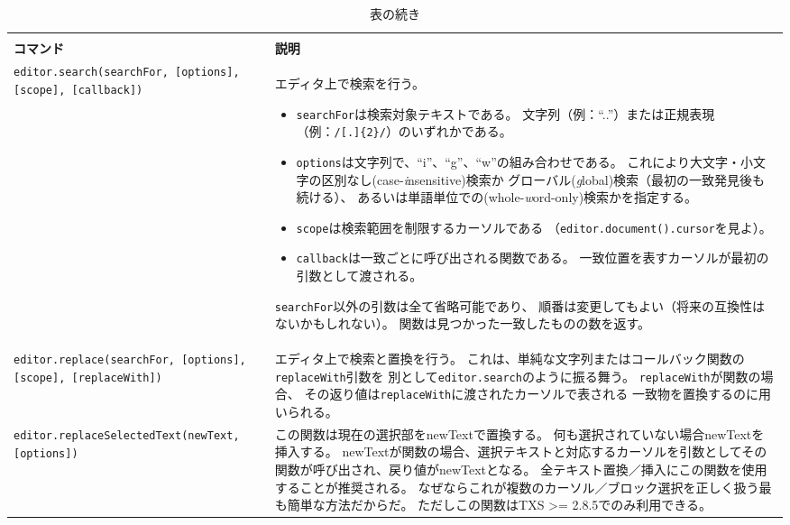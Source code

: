 \begin{longtable}{XX}
  \caption{エディタオブジェクトの一覧}
  \endfirsthead
  \caption{表の続き}
  \endhead
  \hline
  \multicolumn{2}{c}{\textbf{エディタオブジェクト}}\\
  \textbf{コマンド} & \textbf{説明}\\
  \hline
  \texttt{editor.search(searchFor, {[}options{]}, {[}scope{]}, {[}callback{]})}
    & エディタ上で検索を行う。
    \begin{itemize}
    \item
      \texttt{searchFor}は検索対象テキストである。
      文字列（例：``..''）または正規表現（例：\verb+/[.]{2}/+）のいずれかである。
    \item
      \texttt{options}は文字列で、``i''、``g''、``w''の組み合わせである。
      これにより大文字・小文字の区別なし(case-\emph{i}nsensitive)検索か
      グローバル(\emph{g}lobal)検索（最初の一致発見後も続ける）、
      あるいは単語単位での(whole-\emph{w}ord-only)検索かを指定する。
    \item
      \texttt{scope}は検索範囲を制限するカーソルである
      （\texttt{editor.document().cursor}を見よ）。
    \item
      \texttt{callback}は一致ごとに呼び出される関数である。
      一致位置を表すカーソルが最初の引数として渡される。
    \end{itemize}

    \texttt{searchFor}以外の引数は全て省略可能であり、
    順番は変更してもよい（将来の互換性はないかもしれない）。
    関数は見つかった一致したものの数を返す。\\
  \texttt{editor.replace(searchFor, {[}options{]}, {[}scope{]}, {[}replaceWith{]})}
    & エディタ上で検索と置換を行う。
    これは、単純な文字列またはコールバック関数の\texttt{replaceWith}引数を
    別として\texttt{editor.search}のように振る舞う。
    \texttt{replaceWith}が関数の場合、
    その返り値は\texttt{replaceWith}に渡されたカーソルで表される
    一致物を置換するのに用いられる。\\
  \texttt{editor.replaceSelectedText(newText, {[}options{]})}
    & この関数は現在の選択部をnewTextで置換する。
    何も選択されていない場合newTextを挿入する。\newline
    newTextが関数の場合、選択テキストと対応するカーソルを引数としてその関数が呼び出され、戻り値がnewTextとなる。\newline
    全テキスト置換／挿入にこの関数を使用することが推奨される。
    なぜならこれが複数のカーソル／ブロック選択を正しく扱う最も簡単な方法だからだ。
    ただしこの関数はTXS \textgreater{}= 2.8.5でのみ利用できる。\newline


\end{longtable}
